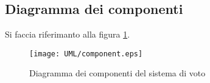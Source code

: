 \subsection{Diagramma dei componenti}
Si faccia riferimanto alla figura \ref{fig:component}.

\begin{figure}[ht]
	\centering
	\texttt{[image: UML/component.eps]}
	\caption{Diagramma dei componenti del sistema di voto}
	\label{fig:component}
\end{figure}
